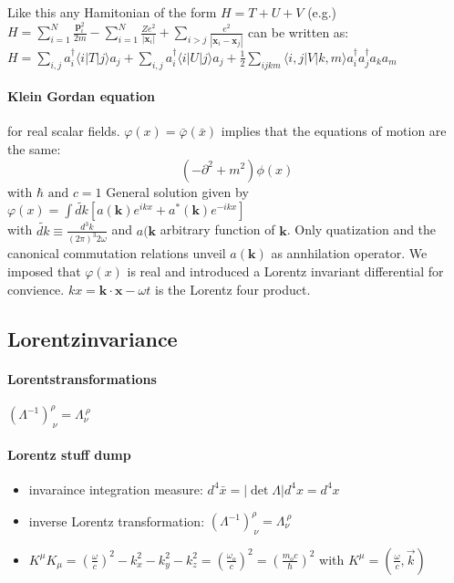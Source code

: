 Like this any Hamitonian of the form $H=T+U+V$ (e.g.) \\ 
$H=\sum_{i=1}^N \frac{\mathbf{p}_i^2}{2 m}-\sum_{i=1}^N \frac{Z e^2}{\left|\mathbf{x}_i\right|}+\sum_{i>j} \frac{e^2}{\left|\mathbf{x}_i-\mathbf{x}_j\right|}$
can be written as:\\
$H=\sum_{i, j} a_i^{\dagger}\langle i|T| j\rangle a_j+\sum_{i, j} a_i^{\dagger}\langle i|U| j\rangle a_j+\frac{1}{2} \sum_{i j k m}\langle i, j|V| k, m\rangle a_i^{\dagger} a_j^{\dagger} a_k a_m$

\paragraph{Klein Gordan equation} for real scalar fields. $\varphi (x) = \bar{\varphi}(\bar{x})$ implies that the equations of motion are the same:
$$ (- \partial^2 + m^2)\phi(x)$$ with $\hbar \text{ and } c = 1$
General solution given by $\varphi(x)=\int \widetilde{d k}\left[a(\mathbf{k}) e^{i k x}+a^*(\mathbf{k}) e^{-i k x}\right]$\\
with $ \widetilde{d k} \equiv \frac{d^3 k}{(2 \pi)^3 2 \omega}$ and $a(\mathbf{k}$ arbitrary function of $\mathbf{k}$. Only quatization and the canonical commutation relations unveil $a(\mathbf{k})$ as annhilation operator. 
We imposed that $\varphi(x)$ is real and introduced a Lorentz invariant differential for convience. $k x=\mathbf{k} \cdot \mathbf{x}-\omega t$ is the Lorentz four product. 

\subsection{Lorentzinvariance}


\paragraph{Lorentstransformations} $\left(\Lambda^{-1}\right)_{\ \nu}^\rho=\Lambda_\nu^{\ \rho}$

\paragraph{Lorentz stuff dump}
\begin{itemize}
  \item invaraince integration measure: $d^4 \bar{x}=|\operatorname{det} \Lambda| d^4 x=d^4 x$
  \item inverse Lorentz transformation: $\left(\Lambda^{-1}\right)_{\ \nu}^\rho=\Lambda_\nu^{\ \rho}$
  \item $K^\mu K_\mu=\left(\frac{\omega}{c}\right)^2-k_x^2-k_y^2-k_z^2=\left(\frac{\omega_o}{c}\right)^2=\left(\frac{m_o c}{\hbar}\right)^2$ with $K^\mu = \left( \frac{\omega}{c} , \vec{k} \right)$
\end{itemize}








